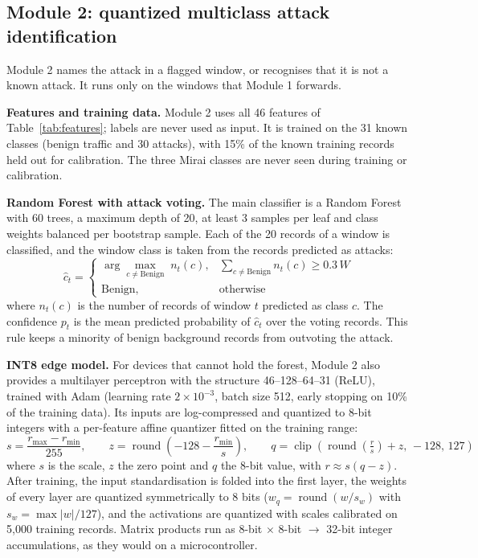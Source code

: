 \documentclass[]{interact}
\theoremstyle{plain}
\theoremstyle{definition}
\begin{document}
\subsection{Module 2: quantized multiclass attack identification}\label{sec:m2}
Module 2 names the attack in a flagged window, or recognises that it is not a known attack. It runs only on the windows that Module 1 forwards.

\textbf{Features and training data.} Module 2 uses all 46 features of Table~\ref{tab:features}; labels are never used as input. It is trained on the 31 known classes (benign traffic and 30 attacks), with 15\% of the known training records held out for calibration. The three Mirai classes are never seen during training or calibration.

\textbf{Random Forest with attack voting.} The main classifier is a Random Forest\cite{breiman2001random} with 60 trees, a maximum depth of 20, at least 3 samples per leaf and class weights balanced per bootstrap sample. Each of the 20 records of a window is classified, and the window class is taken from the records predicted as attacks:
\begin{equation}
  \hat{c}_t = \begin{cases}
    \arg\max_{c \neq \text{Benign}} \; n_t(c), & \sum_{c \neq \text{Benign}} n_t(c) \ge 0.3\,W\\
    \text{Benign}, & \text{otherwise}
  \end{cases}
\end{equation}
where $n_t(c)$ is the number of records of window $t$ predicted as class $c$. The confidence $p_t$ is the mean predicted probability of $\hat{c}_t$ over the voting records. This rule keeps a minority of benign background records from outvoting the attack.

\textbf{INT8 edge model.} For devices that cannot hold the forest, Module 2 also provides a multilayer perceptron with the structure 46--128--64--31 (ReLU), trained with Adam (learning rate $2\times10^{-3}$, batch size 512, early stopping on 10\% of the training data). Its inputs are log-compressed and quantized to 8-bit integers with a per-feature affine quantizer fitted on the training range:
\begin{equation}
  s = \frac{r_{\max}-r_{\min}}{255}, \qquad
  z = \operatorname{round}\!\left(-128 - \frac{r_{\min}}{s}\right), \qquad
  q = \operatorname{clip}\!\left(\operatorname{round}\!\left(\tfrac{r}{s}\right) + z,\,-128,\,127\right)
\end{equation}
where $s$ is the scale, $z$ the zero point and $q$ the 8-bit value, with $r \approx s(q - z)$. After training, the input standardisation is folded into the first layer, the weights of every layer are quantized symmetrically to 8 bits ($w_q = \operatorname{round}(w/s_w)$ with $s_w = \max|w|/127$), and the activations are quantized with scales calibrated on 5,000 training records. Matrix products run as 8-bit $\times$ 8-bit $\rightarrow$ 32-bit integer accumulations\cite{jacob2018quantization}, as they would on a microcontroller.
\end{document}
